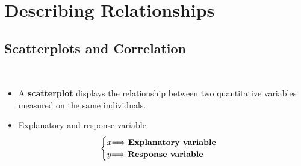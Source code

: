 \documentclass[Main.tex]{subfiles}
\begin{document}
	
	\chapter{Describing Relationships}
	
	
	\section{Scatterplots and Correlation}

	\begin{example}[Scatterplots] \hfill \\
		\begin{itemize}
			\item A \textbf{scatterplot} displays the relationship between two quantitative variables measured on the same individuals.\\
			\item Explanatory and response variable:
				 \begin{subequations}
				 	\begin{align}
				 	\begin{cases}
				 	\text{$x$$\Longrightarrow$ \textbf{Explanatory variable}}\\
				 	\text{$y$$\Longrightarrow$ \textbf{Response variable}}
				 	\end{cases}
				 	\end{align}
				 \end{subequations}			
		\end{itemize}
	\end{example}
	
\end{document}
